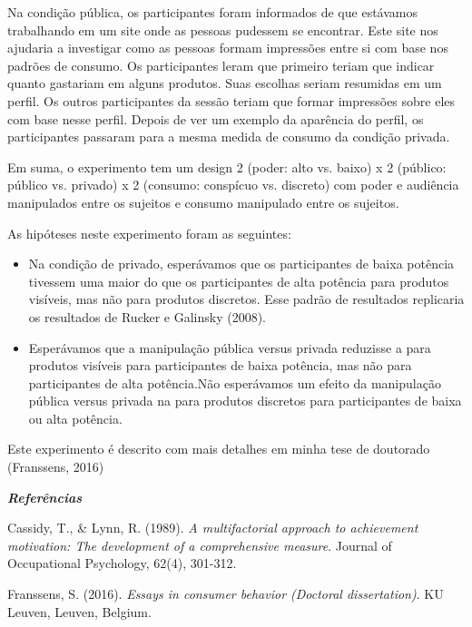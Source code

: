 \documentclass{article}
\begin{document}
Na condição pública, os participantes foram informados de que estávamos trabalhando em um site onde as pessoas pudessem se encontrar. Este site nos ajudaria a investigar como as pessoas formam impressões entre si com base nos padrões de consumo. Os participantes leram que primeiro teriam que indicar quanto gastariam em alguns produtos. Suas escolhas seriam resumidas em um perfil. Os outros participantes da sessão teriam que formar impressões sobre eles com base nesse perfil. Depois de ver um exemplo da aparência do perfil, os participantes passaram para a mesma medida de consumo da condição privada.

Em suma, o experimento tem um design 2 (poder: alto vs. baixo) x 2 (público: público vs. privado) x 2 (consumo: conspícuo vs. discreto) com poder e audiência manipulados entre os sujeitos e consumo manipulado entre os sujeitos.

As hipóteses neste experimento foram as seguintes:

\begin{itemize}
\item Na condição de privado, esperávamos que os participantes de baixa potência tivessem uma  maior do que os participantes de alta potência para produtos visíveis, mas não para produtos discretos. Esse padrão de resultados replicaria os resultados de Rucker e Galinsky (2008).
\item Esperávamos que a manipulação pública versus privada reduzisse a  para produtos visíveis para participantes de baixa potência, mas não para participantes de alta potência.Não esperávamos um efeito da manipulação pública versus privada na  para produtos discretos para participantes de baixa ou alta potência.
\end{itemize}

Este experimento é descrito com mais detalhes em minha tese de doutorado (Franssens, 2016)

\newpage

\vspace{.25cm}
\textbf{\textit{Referências}}
\vspace{.5cm}

\hspace{-.5cm}Cassidy, T., & Lynn, R. (1989). \textit{A multifactorial approach to achievement motivation: The development of a comprehensive measure}. Journal of Occupational Psychology, 62(4), 301-312.

\vspace{.25cm}
\hspace{-.5cm}Franssens, S. (2016). \textit{Essays in consumer behavior (Doctoral dissertation)}. KU Leuven, Leuven, Belgium.
\end{document}
